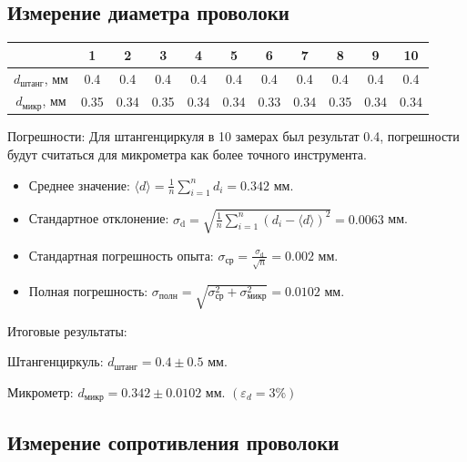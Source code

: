 \documentclass[a4paper]{article}
\begin{document}
\subsection{Измерение диаметра проволоки}
\begin{center}
    \begin{tabular}{|c | c | c | c | c | c | c | c | c | c | c |} 
     \hline
      & 1 & 2 & 3& 4& 5& 6 & 7 & 8 & 9 & 10 \\
    \hline
     $d_\text{штанг}$, мм & 0.4 & 0.4 & 0.4 & 0.4 & 0.4 & 0.4 & 0.4 & 0.4 & 0.4 & 0.4  \\ 
     \hline
     $d_\text{микр}$, мм & 0.35 & 0.34 & 0.35 & 0.34 & 0.34 & 0.33 & 0.34 & 0.35 & 0.34 & 0.34 \\
     \hline
    \end{tabular} 
\end{center}
Погрешности: 
Для штангенциркуля в 10 замерах был результат 0.4, погрешности будут считаться для микрометра как более точного инструмента.
\begin{itemize}
\item Среднее значение: $\langle d \rangle = \frac{1}{n}\sum\limits_{i=1}^n d_{i} = 0.342$ мм. 
\item Стандартное отклонение: $\sigma_\text{d} = \sqrt{\frac{1}{n}\sum\limits_{i=1}^n(d_{i} - \langle d \rangle)^2} = 0.0063$ мм.
\item Стандартная погрешность опыта: $\sigma_\text{ср} = \frac{\sigma_\text{d}}{\sqrt{n}} =  0.002$ мм.
\item Полная погрешность: $\sigma_\text{полн} = \sqrt{\sigma_\text{ср}^2 + \sigma_\text{микр}^2} = 0.0102$ мм.
\end{itemize}
Итоговые результаты: \par
Штангенциркуль: $d_{\text{штанг}} = 0.4 \pm 0.5$ мм.\par
Микрометр: $d_{\text{микр}} = 0.342 \pm 0.0102$ мм. $(\varepsilon_{d} = 3\% )$

\subsection{Измерение сопротивления проволоки}
\end{document}
